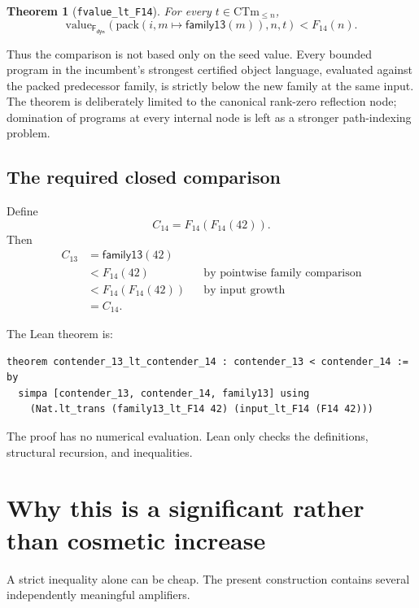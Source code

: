 \documentclass[11pt]{article}
\newtheorem{theorem}{Theorem}[section]
\theoremstyle{definition}
\theoremstyle{remark}
\newcommand{\lean}[1]{\texttt{#1}}
\newcommand{\Fd}{\mathsf{F}_{\mathsf{dyn}}}
\newcommand{\C}[1]{C_{#1}}
\begin{document}
\begin{theorem}[\lean{fvalue\_lt\_F14}]
For every $t\in\mathrm{CTm}_{\le n}$,
\[
\mathrm{value}_{\Fd}
  (\mathrm{pack}(i,m\mapsto\mathsf{family13}(m)),n,t)<F_{14}(n).
\]
\end{theorem}

Thus the comparison is not based only on the seed value.  Every bounded
program in the incumbent's strongest certified object language, evaluated
against the packed predecessor family, is strictly below the new family at the
same input.  The theorem is deliberately limited to the canonical rank-zero
reflection node; domination of programs at every internal node is left as a
stronger path-indexing problem.

\subsection{The required closed comparison}

Define
\[
\C{14}=F_{14}(F_{14}(42)).
\]
Then
\begin{align*}
\C{13}
 &=\mathsf{family13}(42)\\
 &<F_{14}(42) &&\text{by pointwise family comparison}\\
 &<F_{14}(F_{14}(42)) &&\text{by input growth}\\
 &=\C{14}.
\end{align*}

The Lean theorem is:

\begin{lstlisting}
theorem contender_13_lt_contender_14 : contender_13 < contender_14 := by
  simpa [contender_13, contender_14, family13] using
    (Nat.lt_trans (family13_lt_F14 42) (input_lt_F14 (F14 42)))
\end{lstlisting}

The proof has no numerical evaluation.  Lean only checks the definitions,
structural recursion, and inequalities.

\section{Why this is a significant rather than cosmetic increase}

A strict inequality alone can be cheap.  The present construction contains
several independently meaningful amplifiers.
\end{document}
